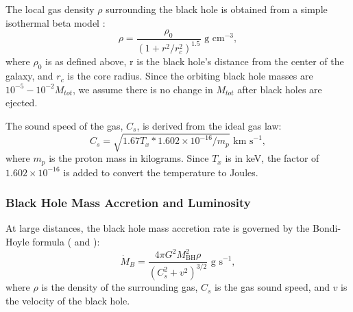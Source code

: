 \documentclass[fleqn,usenatbib,useAMS]{mnras}
\begin{document}
The local gas density ${\rho}$ surrounding the black hole is obtained from a simple isothermal beta model \citep{1962AJ.....67..471K, 1976A&A....49..137C, 1978A&A....70..677C}:
\begin{equation} \label{beta_model}
    \rho = \frac{\rho_0}{(1+r^2/r_c^2)^{1.5}} \text{  g cm}^{-3},
\end{equation}
where $\rho_0$ is as defined above, r is the black hole's distance from the center of the galaxy, and $r_c$ is the core radius.  Since the orbiting black hole masses are $10^{-5}-10^{-2}M_{tot}$, we assume there is no change in $M_{tot}$ after black holes are ejected.

The sound speed of the gas, $C_s$, is derived from the ideal gas law:
\begin{equation}\label{gas_sound_speed}
    C_s = \sqrt{1.67T_x*1.602\times10^{-16}/m_p} \text{  km s}^{-1},
\end{equation}
where $m_p$ is the proton mass in kilograms.  Since $T_x$ is in keV, the factor of $1.602\times10^{-16}$ is added to convert the temperature to Joules.

\subsubsection{Black Hole Mass Accretion and Luminosity}
At large distances, the black hole mass accretion rate is governed by the Bondi-Hoyle formula (\citet{1944MNRAS.104..273B} and \citet{1952MNRAS.112..195B}):
\begin{equation}\label{net_accretion}
    \dot{M}_{B} = \frac{4{\pi}G^2M_\mathrm{BH}^2\rho}{(C_s^2+v^2)^{3/2}} \text{  g}\text{ s}^{-1},
\end{equation}
where $\rho$ is the density of the surrounding gas, $C_s$ is the gas sound speed, and $v$ is the velocity of the black hole.
\end{document}
